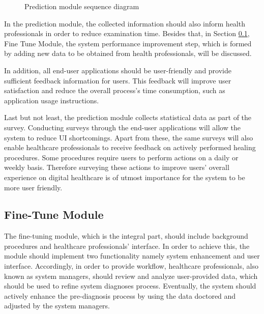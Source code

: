 \begin{figure}[htbp]
\centering
{}
\caption{Prediction module sequence diagram}
\label{fig:PredictionModuleSequenceDiagram}
\end{figure}

In the prediction module, the collected information should also inform health professionals in order to reduce examination time. Besides that, in Section \ref{sec:FineTuneModule}, Fine Tune Module, the system performance improvement step, which is formed by adding new data to be obtained from health professionals, will be discussed.

In addition, all end-user applications should be user-friendly and provide sufficient feedback information for users. This feedback will improve user satisfaction and reduce the overall process's time consumption, such as application usage instructions.

Last but not least, the prediction module collects statistical data as part of the survey. Conducting surveys through the end-user applications will allow the system to reduce UI shortcomings. Apart from these, the same surveys will also enable healthcare professionals to receive feedback on actively performed healing procedures. Some procedures require users to perform actions on a daily or weekly basis. Therefore surveying these actions to improve users' overall experience on digital healthcare is of utmost importance for the system to be more user friendly.

\subsection{ Fine-Tune Module }\label{sec:FineTuneModule}

The fine-tuning module, which is the integral part, should include background procedures and healthcare professionals' interface. In order to achieve this, the module should implement two functionality namely system enhancement and user interface. Accordingly, in order to provide workflow, healthcare professionals, also known as system managers, should review and analyze user-provided data, which should be used to refine system diagnoses process. Eventually, the system should actively enhance the pre-diagnosis process by using the data doctored and adjusted by the system managers.

